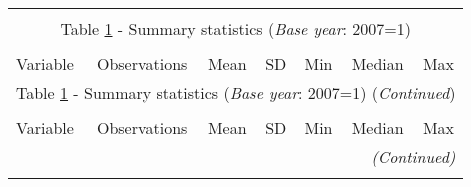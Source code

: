 \begin{longtable}{lcccccc}\\
	\label{tab:number of firms}\\
	\multicolumn{7}{c}{Table \ref{tab:number of firms} - Summary statistics  (\textit{Base year}: 2007=1)}\\ \hline \hline\\
	
	Variable   &   Observations &    Mean &          SD&         Min&    Median &    Max\\
	
	\hline \endfirsthead
	
	\multicolumn{7}{c}{Table \ref{tab:number of firms} - Summary statistics (\textit{Base year}: 2007=1) (\textit{Continued})}\\ \hline \hline\\
	
	Variable   &   Observations &    Mean &          SD&         Min&     Median  &  Max\\
	
	\hline \endhead
	\hline
	\multicolumn{7}{r}{{\textit{(Continued)}}}\\ \endfoot
	
	\endlastfoot
	

\end{longtable}
